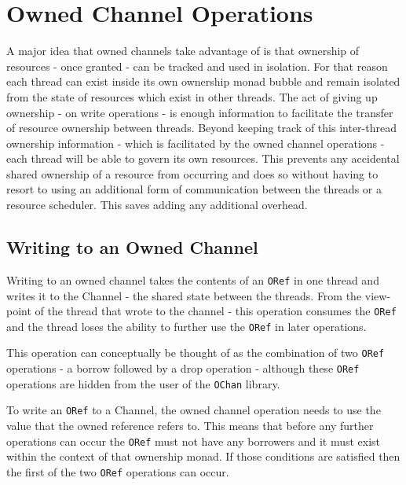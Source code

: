 \documentclass[onehalf,11pt]{beavtex}
\begin{document}
\section{Owned Channel Operations}

A major idea that owned channels take advantage of is that ownership
of resources - once granted - can be tracked and used in isolation. For that reason
each thread can exist inside its own ownership monad bubble and
remain isolated from the state of resources which exist in other threads.
The act of giving up ownership - on write operations - is enough information to
facilitate the transfer of resource ownership between threads.
Beyond keeping track of this inter-thread ownership information - which is
facilitated by the owned channel operations - each thread will be able
to govern its own resources.  This prevents any accidental shared ownership of
a resource from occurring and does so without having to resort to using an
additional form of communication between the threads or a resource scheduler.
This saves adding any additional overhead.



\subsection{Writing to an Owned Channel}

Writing to an owned channel takes the contents of an \texttt{ORef} in
one thread and writes it to the Channel - the shared state between the threads.
From the view-point of the thread that wrote to the channel - this operation
consumes the \texttt{ORef} and the thread loses the ability to further use the
\texttt{ORef} in later operations.

This operation can conceptually be thought of as the combination of two
\texttt{ORef} operations - a borrow followed by a drop operation -
although these \texttt{ORef} operations are hidden from the user of the
\texttt{OChan} library.

To write an \texttt{ORef} to a Channel, the owned channel operation
needs to use the value that the owned reference refers to.  This means
that before any further operations can occur the \texttt{ORef} must not have any
borrowers and it must exist within the context of that ownership monad.
If those conditions are satisfied then the first of the two \texttt{ORef}
operations can occur.
\end{document}
